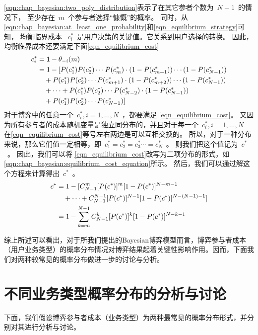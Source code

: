 \eqref{eqn:chap_bayesian:two_poly_distribution}表示了在其它参者个数为~$N-1$~的情况下，
至少存在~$m$~个参与者选择“慷慨”的概率。
同时，从\eqref{eqn:chap_bayesian:at_least_one_probability}和\eqref{eqn_equilibrium_strategy}可知，
均衡临界成本 ~$c_i^*$~是用户决策的关键值。它关系到用户选择的转换。
因此，均衡临界成本还要满足下面\eqref{eqn_equilibrium_cost}
\begin{align}
    c_i^* &= 1 - \theta_{-i} (m) \notag \\
     & =1 - [P(c_1^*)P(c_2^*)\cdots P(c_{m}^*) \cdot (1-P(c_{m+1}^*)) \cdots(1-P(c_{N-1}^*)) \notag \\ 
    & \quad +  P(c_1^*)P(c_2^*)\cdots P(c_{m+1}^*) \cdot (1-P(c_{m+2}^*)) \cdots(1-P(c_{N-1}^*)) \notag \\ 
    & \quad + \cdots  + P(c_1^*)P(c_2^*)\cdots P(c_{N-2}^*) \cdot (1-P(c_{N-1}^*)) \notag \\
    & \quad +  P(c_1^*)P(c_2^*)\cdots P(c_{N-1}^*) ]
    \label{eqn_equilibrium_cost} 
\end{align}
对于博弈中的任意一个~$c_i^*, i=1,\ldots, N$~，都要满足
\eqref{eqn_equilibrium_cost}。
又因为所有参与者的成本随机变量是独立同分布的，并且对于每一个~$c_i^*, i=1,\ldots, N$~
在\eqref{eqn_equilibrium_cost}等号左右两边是可以互相交换的。
所以，对于一种分布来说，那么它们值一定相等，即~$c_1^* = c_2^* = c_3^* \cdots = c_N^*$~。
则我们把这个值记为~$c^*$~。
因此，我们可以将 \eqref{eqn_equilibrium_cost}改写为二项分布的形式，如
\eqref{eqn:chap_bayesian:equilibrium_cost_equation}所示。
然后，我们可以通过解这个方程来计算得出~$c^*$~。
\begin{align}  
    c^* & =  1 - [ C_{N-1}^m [P(c^*)]^m [1-P(c^*)]^{N-m-1} \notag \\
   & \quad + \cdots + C_{N-1}^{N-1} [P(c^*)]^{N-1} [1-P(c^*)]^{N-(N-1)-1} ]\notag \\
   &= 1- \sum_{k=m}^{N-1}C_{N-1}^k [P(c^*)]^k [1-P(c^*)]^{N-k-1}
\label{eqn:chap_bayesian:equilibrium_cost_equation}
\end{align}

综上所述可以看出，对于所我们提出的Bayesian博弈模型而言，博弈参与者成本（用户业务类型）的概率分布情况对博弈结果起着关键性影响作用。因而，下面我们对两种较常见的概率分布做进一步的讨论与分析。

\section{不同业务类型概率分布的分析与讨论}
下面，我们假设博弈参与者成本（业务类型）为两种最常见的概率分布形式，并分别对其进行分析与讨论。
